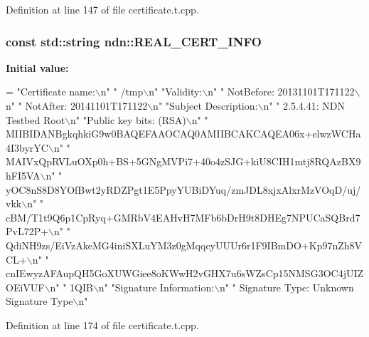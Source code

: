 \begin{DoxyVerb}
Definition at line 147 of file certificate.\+t.\+cpp.

\subsubsection[{\texorpdfstring{R\+E\+A\+L\+\_\+\+C\+E\+R\+T\+\_\+\+I\+N\+FO}{REAL\_CERT\_INFO}}]{\setlength{\rightskip}{0pt plus 5cm}const std\+::string ndn\+::\+R\+E\+A\+L\+\_\+\+C\+E\+R\+T\+\_\+\+I\+N\+FO}\hypertarget{namespacendn_aa58153273f8d1fc92d3a7602e0fc40c5}{}\label{namespacendn_aa58153273f8d1fc92d3a7602e0fc40c5}
{\bfseries Initial value\+:}
\begin{DoxyCode}
= \textcolor{stringliteral}{"Certificate name:\(\backslash\)n"}
\textcolor{stringliteral}{"  /tmp\(\backslash\)n"}
\textcolor{stringliteral}{"Validity:\(\backslash\)n"}
\textcolor{stringliteral}{"  NotBefore: 20131101T171122\(\backslash\)n"}
\textcolor{stringliteral}{"  NotAfter: 20141101T171122\(\backslash\)n"}
\textcolor{stringliteral}{"Subject Description:\(\backslash\)n"}
\textcolor{stringliteral}{"  2.5.4.41: NDN Testbed Root\(\backslash\)n"}
\textcolor{stringliteral}{"Public key bits: (RSA)\(\backslash\)n"}
\textcolor{stringliteral}{"  MIIBIDANBgkqhkiG9w0BAQEFAAOCAQ0AMIIBCAKCAQEA06x+elwzWCHa4I3byrYC\(\backslash\)n"}
\textcolor{stringliteral}{"  MAIVxQpRVLuOXp0h+BS+5GNgMVPi7+40o4zSJG+kiU8CIH1mtj8RQAzBX9hFI5VA\(\backslash\)n"}
\textcolor{stringliteral}{"  yOC8nS8D8YOfBwt2yRDZPgt1E5PpyYUBiDYuq/zmJDL8xjxAlxrMzVOqD/uj/vkk\(\backslash\)n"}
\textcolor{stringliteral}{"  cBM/T1t9Q6p1CpRyq+GMRbV4EAHvH7MFb6bDrH9t8DHEg7NPUCaSQBrd7PvL72P+\(\backslash\)n"}
\textcolor{stringliteral}{"  QdiNH9zs/EiVzAkeMG4iniSXLuYM3z0gMqqcyUUUr6r1F9IBmDO+Kp97nZh8VCL+\(\backslash\)n"}
\textcolor{stringliteral}{"  cnIEwyzAFAupQH5GoXUWGiee8oKWwH2vGHX7u6sWZsCp15NMSG3OC4jUIZOEiVUF\(\backslash\)n"}
\textcolor{stringliteral}{"  1QIB\(\backslash\)n"}
\textcolor{stringliteral}{"Signature Information:\(\backslash\)n"}
\textcolor{stringliteral}{"  Signature Type: Unknown Signature Type\(\backslash\)n"}
\end{DoxyCode}


Definition at line 174 of file certificate.\+t.\+cpp.


\end{DoxyVerb}
